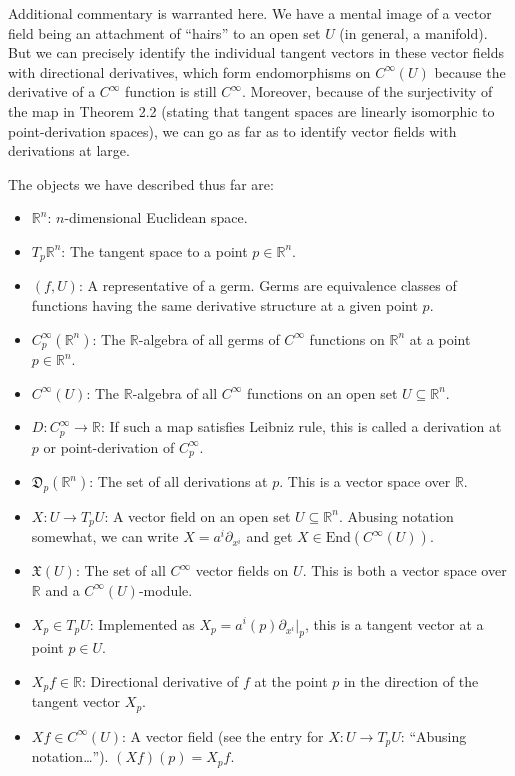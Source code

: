 \documentclass[a4paper]{article}
\newcommand{\R}{\mathbb{R}}
\begin{document}
Additional commentary is warranted here. We have a mental image of a vector field being an attachment of ``hairs'' to an open set $U$ (in general, a manifold). But we can precisely identify the individual tangent vectors in these vector fields with directional derivatives, which form endomorphisms on $C^\infty(U)$ because the derivative of a $C^\infty$ function is still $C^\infty$. Moreover, because of the surjectivity of the map in Theorem 2.2 (stating that tangent spaces are linearly isomorphic to point-derivation spaces), we can go as far as to identify vector fields with derivations at large.

The objects we have described thus far are:
\begin{itemize}
    \item $\R^n$: $n$-dimensional Euclidean space.
    \item $T_p\R^n$: The tangent space to a point $p \in \R^n$.
    \item $(f, U)$: A representative of a germ. Germs are equivalence classes of functions having the same derivative structure at a given point $p$.
    \item $C_p^\infty(\R^n)$: The $\R$-algebra of all germs of $C^\infty$ functions on $\R^n$ at a point $p \in \R^n$.
    \item $C^\infty(U)$: The $\R$-algebra of all $C^\infty$ functions on an open set $U \subseteq \R^n$.
    \item $D : C_p^\infty \to \R$: If such a map satisfies Leibniz rule, this is called a derivation at $p$ or point-derivation of $C_p^\infty$.
    \item $\mathfrak{D}_p(\R^n)$: The set of all derivations at $p$. This is a vector space over $\R$.
    \item $X : U \to T_pU$: A vector field on an open set $U \subseteq \R^n$. Abusing notation somewhat, we can write $X = a^i\partial_{x^i}$ and get $X \in \text{End}(C^\infty(U))$.
    \item $\mathfrak{X}(U)$: The set of all $C^\infty$ vector fields on $U$. This is both a vector space over $\R$ and a $C^\infty(U)$-module.
    \item $X_p \in T_pU$: Implemented as $X_p = a^i(p)\partial_{x^i}|_p$, this is a tangent vector at a point $p \in U$.
    \item $X_pf \in \R$: Directional derivative of $f$ at the point $p$ in the direction of the tangent vector $X_p$.
    \item $Xf \in C^\infty(U)$: A vector field (see the entry for $X : U \to T_pU$: ``Abusing notation\ldots''). $(Xf)(p) = X_pf$.
\end{itemize}
\end{document}
